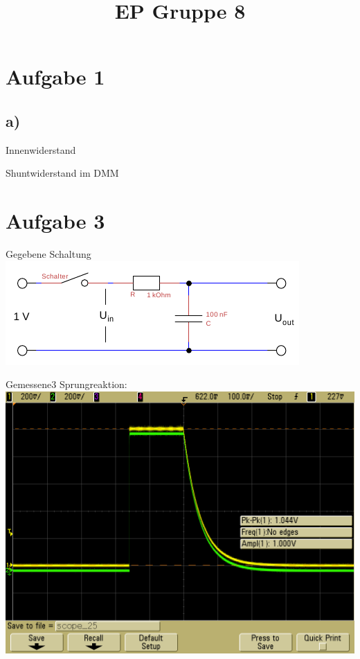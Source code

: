 \documentclass[compress,11pt]{beamer}
\title{EP Gruppe 8}
\begin{document}
\frame[c]{\titlepage}
\begin{frame}
\tableofcontents
\end{frame}

\section{Aufgabe 1}
\subsection{a)}
\begin{frame}{Innenwiderstand}
\begin{block}{Shuntwiderstand im DMM}
\end{block}
\end{frame}
\section{Aufgabe 3}
\begin{frame}
\begin{block}{Gegebene Schaltung}
\includegraphics[width=\textwidth]{../daten/Messdaten/plots/schalt_tief2}
\end{block}
\end{frame}
\begin{frame}
Gemessene3 Sprungreaktion:\\
\includegraphics[width=\textwidth]{../daten/scope_25}
\end{frame}
\end{document}
